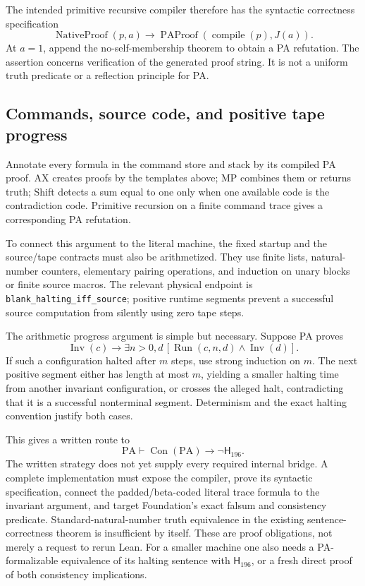 \documentclass[11pt,a4paper]{article}
\newcommand{\PA}{\mathrm{PA}}
\newcommand{\Con}{\operatorname{Con}}
\newcommand{\HH}{\mathsf{H}}
\newcommand{\code}[1]{\nolinkurl{#1}}
\begin{document}
The intended primitive recursive compiler therefore has the syntactic correctness specification
\[
\operatorname{NativeProof}(p,a)\to
\operatorname{PAProof}(\operatorname{compile}(p),J(a)).\tag{PC}
\]
At $a=1$, append the no-self-membership theorem to obtain a PA refutation. The assertion concerns verification of the generated proof string. It is not a uniform truth predicate or a reflection principle for PA.

\subsection{Commands, source code, and positive tape progress}

Annotate every formula in the command store and stack by its compiled PA proof. AX creates proofs by the templates above; MP combines them or returns truth; Shift detects a sum equal to one only when one available code is the contradiction code. Primitive recursion on a finite command trace gives a corresponding PA refutation.

To connect this argument to the literal machine, the fixed startup and the source/tape contracts must also be arithmetized. They use finite lists, natural-number counters, elementary pairing operations, and induction on unary blocks or finite source macros. The relevant physical endpoint is \code{blank_halting_iff_source}; positive runtime segments prevent a successful source computation from silently using zero tape steps.

The arithmetic progress argument is simple but necessary. Suppose PA proves
\[
\operatorname{Inv}(c)\to\exists n>0,d\,
[\operatorname{Run}(c,n,d)\wedge\operatorname{Inv}(d)].
\]
If such a configuration halted after $m$ steps, use strong induction on $m$. The next positive segment either has length at most $m$, yielding a smaller halting time from another invariant configuration, or crosses the alleged halt, contradicting that it is a successful nonterminal segment. Determinism and the exact halting convention justify both cases.

This gives a written route to
\[
\PA\vdash\Con(\PA)\to\neg\HH_{196}.
\]
The written strategy does not yet supply every required internal bridge. A complete implementation must expose the compiler, prove its syntactic specification, connect the padded/beta-coded literal trace formula to the invariant argument, and target Foundation's exact falsum and consistency predicate. Standard-natural-number truth equivalence in the existing sentence-correctness theorem is insufficient by itself. These are proof obligations, not merely a request to rerun Lean. For a smaller machine one also needs a PA-formalizable equivalence of its halting sentence with $\HH_{196}$, or a fresh direct proof of both consistency implications.
\end{document}
